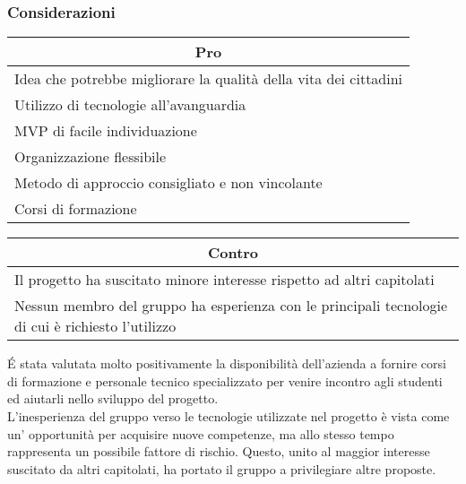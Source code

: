 \subsubsection{Considerazioni}
\begin{minipage}[t]{0.45\linewidth}
    \vspace{0pt}
    {\renewcommand{\arraystretch}{1.5}
    \begin{tabular}{p{1\linewidth}}
        \multicolumn{1}{c}{\textbf{Pro}} \\
        \midrule
        Idea che potrebbe  migliorare la qualità della vita dei cittadini \\
        Utilizzo di tecnologie all'avanguardia \\
        MVP di facile individuazione \\
		Organizzazione flessibile \\
		Metodo di approccio consigliato e non vincolante \\
		Corsi di formazione \\
        \hline
    \end{tabular}
    }
\end{minipage}
\hspace{0.05\linewidth}
\begin{minipage}[t]{0.45\linewidth}
    \vspace{0pt}
    {
    \renewcommand{\arraystretch}{1.5}
    \begin{tabular}{p{1\linewidth}}
        \multicolumn{1}{c}{\textbf{Contro}} \\
        \midrule
        Il progetto ha suscitato minore interesse rispetto ad altri capitolati \\
        Nessun membro del gruppo ha esperienza con le principali tecnologie di cui è richiesto l'utilizzo \\
        \hline
    \end{tabular}
    }
\end{minipage}
\vspace{1em}

\noindent
\'E stata valutata molto positivamente la disponibilità dell'azienda a fornire corsi di formazione e personale tecnico specializzato per venire incontro agli studenti ed aiutarli nello sviluppo del progetto.\\ 
L'inesperienza del gruppo verso le tecnologie utilizzate nel progetto è vista come un' opportunità per acquisire nuove competenze, ma allo stesso tempo rappresenta un possibile fattore di rischio.
Questo, unito al maggior interesse suscitato da altri capitolati, ha portato il gruppo a privilegiare altre proposte.